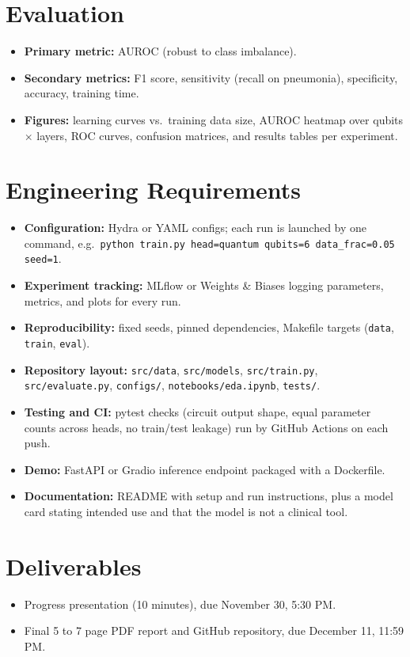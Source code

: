 \documentclass[11pt]{article}
\begin{document}
\section{Evaluation}
\begin{itemize}
  \item \textbf{Primary metric:} AUROC (robust to class imbalance).
  \item \textbf{Secondary metrics:} F1 score, sensitivity (recall on pneumonia), specificity, accuracy, training time.
  \item \textbf{Figures:} learning curves vs.\ training data size, AUROC heatmap over qubits $\times$ layers,
        ROC curves, confusion matrices, and results tables per experiment.
\end{itemize}

\section{Engineering Requirements}
\begin{itemize}
  \item \textbf{Configuration:} Hydra or YAML configs; each run is launched by one command, e.g.\
        \texttt{python train.py head=quantum qubits=6 data\_frac=0.05 seed=1}.
  \item \textbf{Experiment tracking:} MLflow or Weights \& Biases logging parameters, metrics, and plots for every run.
  \item \textbf{Reproducibility:} fixed seeds, pinned dependencies, Makefile targets (\texttt{data}, \texttt{train}, \texttt{eval}).
  \item \textbf{Repository layout:} \texttt{src/data}, \texttt{src/models}, \texttt{src/train.py},
        \texttt{src/evaluate.py}, \texttt{configs/}, \texttt{notebooks/eda.ipynb}, \texttt{tests/}.
  \item \textbf{Testing and CI:} pytest checks (circuit output shape, equal parameter counts across heads,
        no train/test leakage) run by GitHub Actions on each push.
  \item \textbf{Demo:} FastAPI or Gradio inference endpoint packaged with a Dockerfile.
  \item \textbf{Documentation:} README with setup and run instructions, plus a model card stating intended
        use and that the model is not a clinical tool.
\end{itemize}

\section{Deliverables}
\begin{itemize}
  \item Progress presentation (10 minutes), due November 30, 5:30 PM.
  \item Final 5 to 7 page PDF report and GitHub repository, due December 11, 11:59 PM.
\end{itemize}
\end{document}
